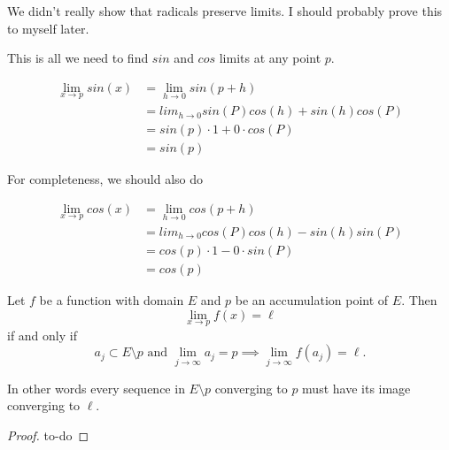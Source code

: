 \documentclass{article}
\begin{document}
\begin{remark}
    We didn't really show that radicals preserve limits. I should probably prove 
    this to myself later.
\end{remark}

This is all we need to find \( sin \) and \( cos \) limits at any point \( p \).  

\begin{align*}
    \lim_{x \to p} sin(x) 
        &= \lim_{h \to 0} sin(p + h) \\
        &= lim_{h \to 0} sin(P)cos(h) + sin(h)cos(P) \\
        &= sin(p) \cdot 1 + 0 \cdot cos(P) \\
        &= sin(p)
\end{align*}

For completeness, we should also do


\begin{align*}
    \lim_{x \to p} cos(x) 
        &= \lim_{h \to 0} cos(p + h) \\
        &= lim_{h \to 0} cos(P)cos(h) - sin(h)sin(P) \\
        &= cos(p) \cdot 1 - 0 \cdot sin(P) \\
        &= cos(p)
\end{align*}

\begin{proposition}
    Let \( f \) be a function with domain \( E \) and \( p \) be an accumulation
    point of \( E \). Then
    \[
        \lim_{x \to p} f(x) = \ell
    \] 
    if and only if 
    \[
        {a_j} \subset E \setminus {p} \text{ and } \lim_{j \to \infty} a_j = p \implies
        \lim_{j \to \infty} f(a_j) = \ell.
    \] 
\end{proposition}

In other words every sequence in \( E \setminus {p} \) converging to \( p \) must have 
its image converging to \( \ell \).
\begin{proof}
   to-do 
\end{proof}
\end{document}
